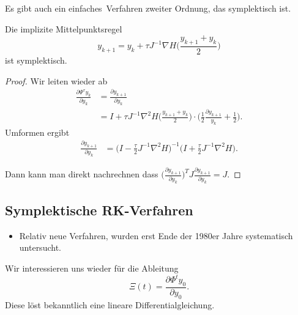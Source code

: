 Es gibt auch ein \glqq einfaches\grqq\ Verfahren zweiter Ordnung, das symplektisch ist.
\begin{satz}
	Die implizite Mittelpunktsregel
	\begin{equation*}
		y_{k+1} = y_k + \tau J^{-1}\nabla H\Big( \frac{y_{k+1}+y_k}{2}\Big)
	\end{equation*}
	ist symplektisch.
\end{satz}
\begin{proof}
	Wir leiten wieder ab
	\begin{align*}
		\frac{\partial \Psi^\tau y_k}{\partial y_k} &= \frac{\partial y_{k+1}}{\partial y_k} \\
		&= I + \tau J^{-1} \nabla^2 H\Big( \frac{y_{k+1} + y_k}{2} \Big) \cdot \Big( \frac{1}{2} \frac{\partial y_{k+1}}{y_k} + \frac{1}{2}\Big).
	\end{align*}
Umformen ergibt
\begin{align*}
 \frac{\partial y_{k+1}}{\partial y_k}
 &=
 \Big( I - \frac{\tau}{2} J^{-1}\nabla^2H\Big)^{-1}\Big(I+\frac{\tau}{2}J^{-1}\nabla^2 H\Big).
\end{align*}

	Dann kann man direkt nachrechnen dass
	$\Big(\frac{\partial y_{k+1}}{\partial y_k}\Big)^T J \frac{\partial y_{k+1}}{\partial y_k} = J$.

 \bigskip
{}
\end{proof}


\subsection{Symplektische RK-Verfahren}

\begin{itemize}
	\item Relativ neue Verfahren, wurden erst Ende der 1980er Jahre systematisch untersucht.
\end{itemize}

Wir interessieren uns wieder für die Ableitung
\begin{equation*}
\Xi(t) = \frac{\partial \Phi^t y_0}{\partial y_0}.
\end{equation*}
Diese löst bekanntlich eine lineare Differentialgleichung.

